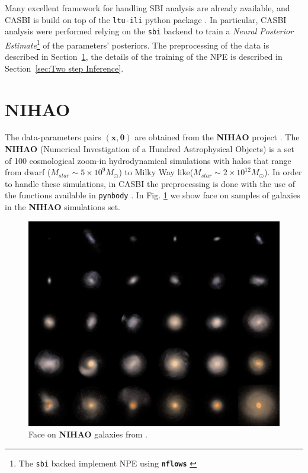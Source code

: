 Many excellent framework for handling SBI analysis are already available, and CASBI is build on top of the \texttt{ltu-ili} python package \cite{hoLtUILIAllinOneFramework2024}. In particular, CASBI analysis were performed relying on the \texttt{sbi} backend \cite{tejero-canteroSbiToolkitSimulationbased2020} to train a \textit{Neural Posterior Estimate}\footnote{The \texttt{sbi} backed implement NPE using \textbf{\texttt{nflows}} \cite{durkanNflowsNormalizingFlows2020}} of the parameters' posteriors. The preprocessing of the data is described in Section~\ref{sec:NIHAO}, the details of the training of the NPE is described in Section~\ref{sec:Two step Inference}.


\section{NIHAO}\label{sec:NIHAO}
The data-parameters pairs $(\mathbf{x}, \boldsymbol{\theta})$ are obtained from the \textbf{NIHAO} project \cite{wangNIHAOProjectReproducing2015}. The \textbf{NIHAO} (Numerical Investigation of a Hundred Astrophysical Objects) is a set of 100 cosmological zoom-in hydrodynamical simulations with halos that range from dwarf ($M_{star} \sim 5 \times 10^9 M_\odot$) to Milky Way like($M_{star} \sim 2 \times 10^{12} M_\odot$). In order to handle these simulations, in CASBI the preprocessing is done with the use of the functions available in \texttt{pynbody} \cite{pontzenPynbodyNBodySPH2013}. In Fig. \ref{fig:NIHAO} we show face on samples of galaxies in the \textbf{NIHAO} simulations set.

\begin{figure}[ht]
    \centering
    \includegraphics[width=1\textwidth]{./figure/NIHAO.jpeg}
    \caption{Face on \textbf{NIHAO} galaxies from \cite{wangNIHAOProjectReproducing2015}.}
    \label{fig:NIHAO}
\end{figure}

